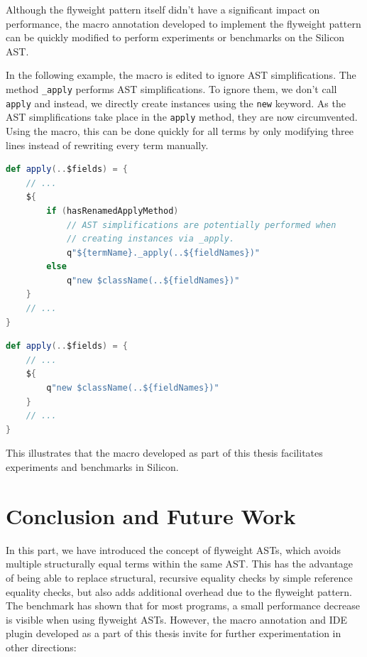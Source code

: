 \documentclass[11pt]{article}
\begin{document}
    Although the flyweight pattern itself didn't have a significant impact on performance,
    the macro annotation developed to implement the flyweight pattern can
    be quickly modified to perform experiments or benchmarks on the Silicon AST.

    In the following example, the macro is edited to ignore AST simplifications.
    The method \texttt{\_apply} performs AST simplifications. To ignore 
    them, we don't call \texttt{apply} and instead,
    we directly create instances using the \texttt{new} keyword.
    As the AST simplifications take place in the \texttt{apply} method, they are now circumvented.
    Using the macro, this can be done quickly for all terms by only modifying three lines
    instead of rewriting every term manually.

    \begin{lstlisting}[language=Scala, caption=Use AST simplifications as normal.]
def apply(..$fields) = {
    // ...
    ${
        if (hasRenamedApplyMethod)
            // AST simplifications are potentially performed when
            // creating instances via _apply.
            q"${termName}._apply(..${fieldNames})"
        else
            q"new $className(..${fieldNames})"
    }
    // ...
}  
    \end{lstlisting}

    \begin{lstlisting}[language=Scala, caption=Modified macro to ignore AST simplifications.]
def apply(..$fields) = {
    // ...
    ${
        q"new $className(..${fieldNames})"
    }
    // ...
}  
    \end{lstlisting}

    This illustrates that the macro developed as part of this thesis
    facilitates experiments and benchmarks in Silicon.



    \newpage
    \section{Conclusion and Future Work}

    In this part, we have introduced the concept of flyweight ASTs,
    which avoids multiple structurally equal terms within the same AST.
    This has the advantage of being able to replace structural, recursive
    equality checks by simple reference equality checks, but also adds
    additional overhead due to the flyweight pattern.
    The benchmark has shown that for most programs,
    a small performance decrease is visible when using flyweight ASTs.
    However, the macro annotation and IDE plugin
    developed as a part of this thesis invite for further
    experimentation in other directions:
\end{document}
